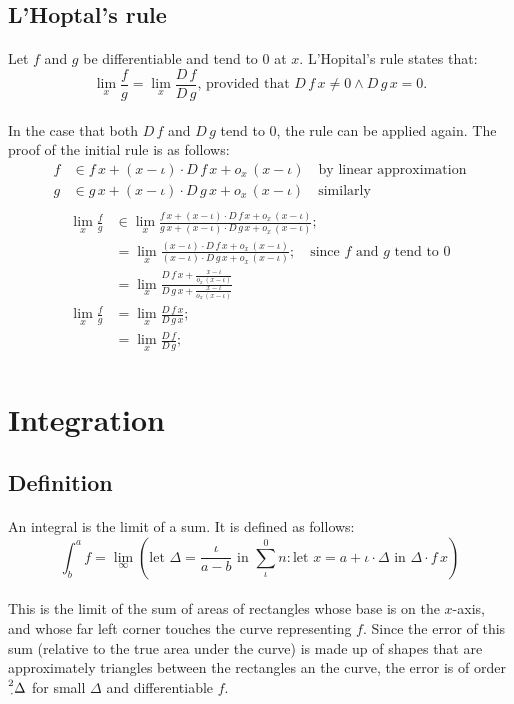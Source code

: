\documentclass[11pt]{article}
\newcommand*\id{\iota}
\newcommand*\cd{\cdot}
\newcommand*\prg{\paragraph}
\newcommand*\pt{\prescript}
\begin{document}
\subsection{L'Hoptal's rule}
\prg{}Let $f$ and $g$ be differentiable and tend to $0$ at $x$. L'Hopital's rule states that:
\[
\lim_x\frac f g=\lim_x\frac{D\,f}{D\,g}\textrm{, provided that }D\,f\,x\neq 0\wedge D\,g\,x=0\textrm{.}
\]
\prg{}In the case that both $D\,f$ and $D\,g$ tend to $0$, the rule can be applied again. The proof of the initial rule is as follows:
\[
\begin{aligned}
f&\in f\,x+(x-\id)\cd D\,f\,x+o_x\,(x-\id) \quad\textrm{by linear approximation} \\
g&\in g\,x+(x-\id)\cd D\,g\,x+o_x\,(x-\id) \quad\textrm{similarly} \\
\end{aligned}
\]
\[
\begin{aligned}
\lim_x\frac f g&\in\lim_x\frac{f\,x+(x-\id)\cd D\,f\,x+o_x\,(x-\id)}{g\,x+(x-\id)\cd D\,g\,x+o_x\,(x-\id)}; \\
&=\lim_x\frac{(x-\id)\cd D\,f\,x+o_x\,(x-\id)}{(x-\id)\cd D\,g\,x+o_x\,(x-\id)}; \quad\textrm{since $f$ and $g$ tend to $0$}\\
&=\lim_x\frac{D\,f\,x+\frac{x-\id}{o_x\,(x-\id)}}{D\,g\,x+\frac{x-\id}{o_x\,(x-\id)}} \\
\lim_x\frac f g&=\lim_x\frac{D\,f\,x}{D\,g\,x}; \\
&=\lim_x\frac{D\,f}{D\,g}; \\
\end{aligned}
\]

\section{Integration}
\subsection{Definition}
\prg{}An integral is the limit of a sum. It is defined as follows:
\[
\int^a_b f=\lim_\infty\left(\textrm{let }\Delta=\frac{\id}{a-b}\textrm{ in }\sum^0_\id n:\textrm{let }x=a+\id\cd\Delta\textrm{ in }\Delta\cd f\,x\right)
\]
\prg{}This is the limit of the sum of areas of rectangles whose base is on the $x$-axis, and whose far left corner touches the curve representing $f$. Since the error of this sum (relative to the true area under the curve) is made up of shapes that are approximately triangles between the rectangles an the curve, the error is of order $\pt 2\cd\Delta$ for small $\Delta$ and differentiable $f$.
\end{document}
